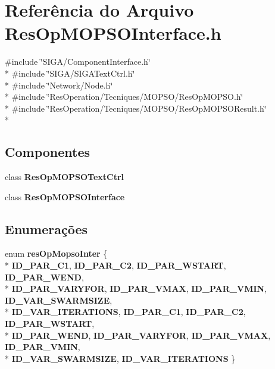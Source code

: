 \section{Referência do Arquivo Res\+Op\+M\+O\+P\+S\+O\+Interface.\+h}
\label{_tecniques_2_m_o_p_s_o_2_res_op_m_o_p_s_o_interface_8h}
{\ttfamily \#include \char`\"{}S\+I\+G\+A/\+Component\+Interface.\+h\char`\"{}}\\*
{\ttfamily \#include \char`\"{}S\+I\+G\+A/\+S\+I\+G\+A\+Text\+Ctrl.\+h\char`\"{}}\\*
{\ttfamily \#include \char`\"{}Network/\+Node.\+h\char`\"{}}\\*
{\ttfamily \#include \char`\"{}Res\+Operation/\+Tecniques/\+M\+O\+P\+S\+O/\+Res\+Op\+M\+O\+P\+S\+O.\+h\char`\"{}}\\*
{\ttfamily \#include \char`\"{}Res\+Operation/\+Tecniques/\+M\+O\+P\+S\+O/\+Res\+Op\+M\+O\+P\+S\+O\+Result.\+h\char`\"{}}\\*
\subsection*{Componentes}
\begin{DoxyCompactItemize}
\item 
class {\bf Res\+Op\+M\+O\+P\+S\+O\+Text\+Ctrl}
\item 
class {\bf Res\+Op\+M\+O\+P\+S\+O\+Interface}
\end{DoxyCompactItemize}
\subsection*{Enumerações}
\begin{DoxyCompactItemize}
\item 
enum {\bf res\+Op\+Mopso\+Inter} \{ \\*
{\bf I\+D\+\_\+\+P\+A\+R\+\_\+\+C1}, 
{\bf I\+D\+\_\+\+P\+A\+R\+\_\+\+C2}, 
{\bf I\+D\+\_\+\+P\+A\+R\+\_\+\+W\+S\+T\+A\+RT}, 
{\bf I\+D\+\_\+\+P\+A\+R\+\_\+\+W\+E\+ND}, 
\\*
{\bf I\+D\+\_\+\+P\+A\+R\+\_\+\+V\+A\+R\+Y\+F\+OR}, 
{\bf I\+D\+\_\+\+P\+A\+R\+\_\+\+V\+M\+AX}, 
{\bf I\+D\+\_\+\+P\+A\+R\+\_\+\+V\+M\+IN}, 
{\bf I\+D\+\_\+\+V\+A\+R\+\_\+\+S\+W\+A\+R\+M\+S\+I\+ZE}, 
\\*
{\bf I\+D\+\_\+\+V\+A\+R\+\_\+\+I\+T\+E\+R\+A\+T\+I\+O\+NS}, 
{\bf I\+D\+\_\+\+P\+A\+R\+\_\+\+C1}, 
{\bf I\+D\+\_\+\+P\+A\+R\+\_\+\+C2}, 
{\bf I\+D\+\_\+\+P\+A\+R\+\_\+\+W\+S\+T\+A\+RT}, 
\\*
{\bf I\+D\+\_\+\+P\+A\+R\+\_\+\+W\+E\+ND}, 
{\bf I\+D\+\_\+\+P\+A\+R\+\_\+\+V\+A\+R\+Y\+F\+OR}, 
{\bf I\+D\+\_\+\+P\+A\+R\+\_\+\+V\+M\+AX}, 
{\bf I\+D\+\_\+\+P\+A\+R\+\_\+\+V\+M\+IN}, 
\\*
{\bf I\+D\+\_\+\+V\+A\+R\+\_\+\+S\+W\+A\+R\+M\+S\+I\+ZE}, 
{\bf I\+D\+\_\+\+V\+A\+R\+\_\+\+I\+T\+E\+R\+A\+T\+I\+O\+NS}
 \}
\end{DoxyCompactItemize}


